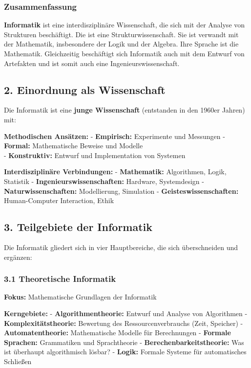 \documentclass[
  11pt,
  a4paper,
  DIV=11,
  numbers=noendperiod]{scrartcl}
\begin{document}
\subsubsection{Zusammenfassung}\label{zusammenfassung}

\textbf{Informatik} ist eine interdisziplinäre Wissenschaft, die sich
mit der Analyse von Strukturen beschäftigt. Die ist eine
Strukturwissenschaft. Sie ist verwandt mit der Mathematik, insbesondere
der Logik und der Algebra. Ihre Sprache ist die Mathematik. Gleichzeitig
beschäftigt sich Informatik auch mit dem Entwurf von Artefakten und ist
somit auch eine Ingenieurswissenschaft.

\subsection{2. Einordnung als
Wissenschaft}\label{einordnung-als-wissenschaft}

Die Informatik ist eine \textbf{junge Wissenschaft} (entstanden in den
1960er Jahren) mit:

\textbf{Methodischen Ansätzen:} - \textbf{Empirisch:} Experimente und
Messungen - \textbf{Formal:} Mathematische Beweise und Modelle\\
- \textbf{Konstruktiv:} Entwurf und Implementation von Systemen

\textbf{Interdisziplinäre Verbindungen:} - \textbf{Mathematik:}
Algorithmen, Logik, Statistik - \textbf{Ingenieurswissenschaften:}
Hardware, Systemdesign - \textbf{Naturwissenschaften:} Modellierung,
Simulation - \textbf{Geisteswissenschaften:} Human-Computer Interaction,
Ethik

\subsection{3. Teilgebiete der
Informatik}\label{teilgebiete-der-informatik}

Die Informatik gliedert sich in vier Hauptbereiche, die sich
überschneiden und ergänzen:

\subsubsection{3.1 Theoretische
Informatik}\label{theoretische-informatik}

\textbf{Fokus:} Mathematische Grundlagen der Informatik

\textbf{Kerngebiete:} - \textbf{Algorithmentheorie:} Entwurf und Analyse
von Algorithmen - \textbf{Komplexitätstheorie:} Bewertung des
Ressourcenverbrauchs (Zeit, Speicher) - \textbf{Automatentheorie:}
Mathematische Modelle für Berechnungen - \textbf{Formale Sprachen:}
Grammatiken und Sprachtheorie - \textbf{Berechenbarkeitstheorie:} Was
ist überhaupt algorithmisch lösbar? - \textbf{Logik:} Formale Systeme
für automatisches Schließen
\end{document}

